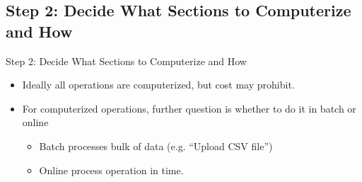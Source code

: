 \documentclass{beamer}
\begin{document}
	\subsection{Step 2: Decide What Sections to Computerize and How}
	\begin{frame}{Step 2: Decide What Sections to Computerize and How}
		\begin{itemize}
			\item Ideally all operations are computerized, but cost may prohibit.
			\item For computerized operations, further question is whether to do it in batch or online
			\begin{itemize}
				\item Batch processes bulk of data (e.g. ``Upload CSV file'')
				\item Online process operation in time.
			\end{itemize}
		\end{itemize}
	\end{frame}
\end{document}
